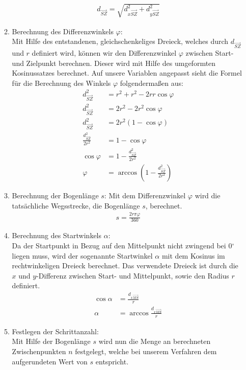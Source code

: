 \begin{itemize}
\begin{enumerate}
\begin{align*}
d_{\overrightarrow{SZ}} = \sqrt{d_{x\overrightarrow{SZ}}^2 + d_{y\overrightarrow{SZ}}^2}
\end{align*}
\item Berechnung des Differenzwinkels $\varphi$:\\
Mit Hilfe des entstandenen, gleichschenkeliges Dreieck, welches durch $d_{\overrightarrow{SZ}}$ und $r$ definiert wird, können wir den Differenzwinkel $\varphi$ zwischen Start- und Zielpunkt berechnen. Dieser wird mit Hilfe des umgeformten Kosinussatzes berechnet. Auf unsere Variablen angepasst sieht die Formel für die Berechnung des Winkels $\varphi$ folgendermaßen aus:
\begin{align*}
d_{\overrightarrow{SZ}}^2 & = r^2 + r^2 - 2rr \cos \varphi \\
d_{\overrightarrow{SZ}}^2 & = 2r^2 - 2r^2 \cos \varphi \\
d_{\overrightarrow{SZ}}^2 & = 2r^2(1 - \cos \varphi) \\
\frac{d_{\overrightarrow{SZ}}^2}{2r^2} & = 1 - \cos \varphi \\
\cos \varphi & = 1 - \frac{d_{\overrightarrow{SZ}}^2}{2r^2} \\
\varphi & = \arccos (1 - \frac{d_{\overrightarrow{SZ}}^2}{2r^2})
\end{align*}
\item Berechnung der Bogenlänge $s$:
Mit dem Differenzwinkel $\varphi$ wird die tatsächliche Wegsstrecke, die Bogenlänge $s$, berechnet.
\begin{align*}
s = \frac{2r \pi \varphi}{360}
\end{align*}
\item Berechnung des Startwinkels $\alpha$:\\
Da der Startpunkt in Bezug auf den Mittelpunkt nicht zwingend bei 0$^\circ$ liegen muss, wird der sogenannte Startwinkel $\alpha$ mit dem Kosinus im rechtwinkeligen Dreieck berechnet. Das verwendete Dreieck ist durch die $x$ und $y$-Differenz zwischen Start- und Mittelpunkt, sowie den Radius $r$ definiert.
\begin{align*}
\cos \alpha & = \frac{d_{x\overrightarrow{MS}}}{r}\\
\alpha & = \arccos \frac{d_{x\overrightarrow{MS}}}{r}
\end{align*}
\item Festlegen der Schrittanzahl:\\
Mit Hilfe der Bogenlänge $s$ wird nun die Menge an berechneten Zwischenpunkten $n$ festgelegt, welche bei unserem Verfahren dem aufgerundeten Wert von  $s$ entspricht.

\end{enumerate}
\end{itemize}
